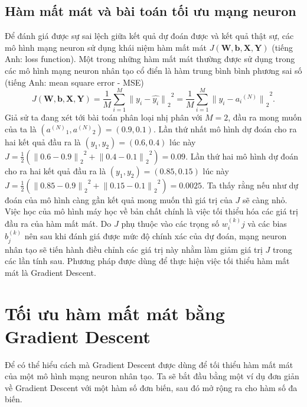 \subsection{Hàm mất mát và bài toán tối ưu mạng neuron}
Để đánh giá được sự sai lệch giữa kết quả dự đoán được và kết quả thật sự, các mô hình mạng neuron sử dụng khái niệm hàm mất mát $J\left(
		{\boldsymbol{W}},{\boldsymbol{b}},{\boldsymbol{X}},{\boldsymbol{Y}}
	\right)$ 
(tiếng Anh: loss function). Một trong những hàm mất mát thường được sử dụng trong các mô hình mạng neuron nhân tạo cổ điển là hàm trung bình bình phương sai số (tiếng Anh: mean square error - MSE)
\begin{equation}
	J
	\left(
		{\boldsymbol{W}},{\boldsymbol{b}},{\boldsymbol{X}},{\boldsymbol{Y}}
	\right)
	=
	{
		{\frac{1}{M}} 
		{\sum_{i=1}^{M}} 
		{ { {\parallel} y_i - \widehat{y_i} {\parallel} }_2 }^2
	}
	=
	{
		{\frac{1}{M}} 
		{\sum_{i=1}^{M}} 
		{ { {\parallel} y_i - {a_i}^{(N)} {\parallel} }_2 }^2
	}.
\end{equation}
Giả sử ta đang xét tới bài toán phân loại nhị phân với $M=2$, đầu ra mong muốn của ta là $\left({a^{(N)}}_1,{a^{(N)}}_2\right) = (0.9,0.1)$. Lần thứ nhất mô hình dự đoán cho ra hai kết quả đầu ra là $(y_1,y_2)=(0.6,0.4)$ lúc này $J=\frac{1}{2}\left( {{{\parallel} 0.6 - 0.9 {\parallel}}_2}^2 + {{{\parallel} 0.4 - 0.1 {\parallel}}_2}^2 \right) = 0.09$. Lần thứ hai mô hình dự đoán cho ra hai kết quả đầu ra là $(y_1,y_2)=(0.85,0.15)$ lúc này $J=\frac{1}{2}\left( {{{\parallel} 0.85 - 0.9 {\parallel}}_2}^2 + {{{\parallel} 0.15 - 0.1 {\parallel}}_2}^2 \right) = 0.0025$. Ta thấy rằng nếu như dự đoán của mô hình càng gần kết quả mong muốn thì giá trị của $J$ sẽ càng nhỏ. Việc học của mô hình máy học về bản chất chính là việc tối thiểu hóa các giá trị đầu ra của hàm mất mát. Do $J$ phụ thuộc vào các trọng số $w^{(k)}_ij$ và các bias $b^{(k)}_j$ nên sau khi đánh giá được mức độ chính xác của dự đoán, mạng neuron nhân tạo sẽ tiến hành điều chỉnh các giá trị này nhằm làm giảm giá trị $J$ trong các lần tính sau. Phương pháp được dùng để thực hiện việc tối thiểu hàm mất mát là Gradient Descent.
\section{Tối ưu hàm mất mát bằng Gradient Descent}
Để có thể hiểu cách mà Gradient Descent\cite[p.158-174]{tiep:2017} được dùng để tối thiểu hàm mất mát của một mô hình mạng neuron nhân tạo. Ta sẽ bắt đầu bằng một ví dụ đơn giản về Gradient Descent với một hàm số đơn biến, sau đó mở rộng ra cho hàm số đa biến.
